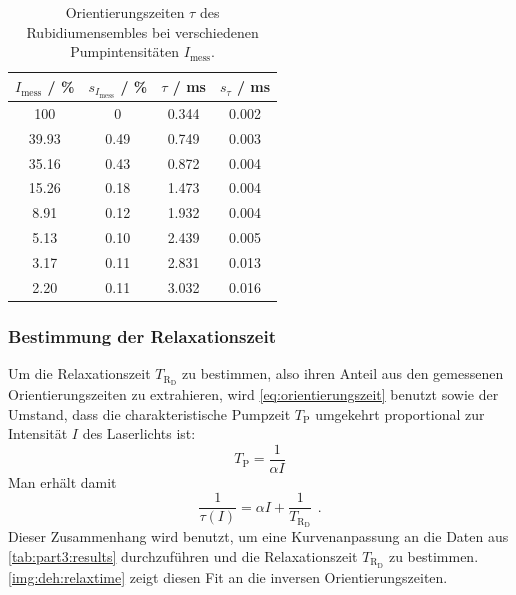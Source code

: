 %

\begin{table}[H]
\caption{Orientierungszeiten $\tau$ des Rubidiumensembles bei verschiedenen Pumpintensitäten $I_{\text{mess}}$.}
\begin{center}
\begin{tabular}{|c|c|c|c|}
  \hline
  $I_\text{mess}$ / \% & $s_{I_\text{mess}}$ / \% & $\tau$ / ms & $s_\tau$ / ms \\ \hline
  100 & 0 & 0.344 & 0.002 \\ \hline
  39.93 & 0.49 & 0.749 & 0.003 \\ \hline
  35.16 & 0.43 & 0.872 & 0.004 \\ \hline
  15.26 & 0.18 & 1.473 & 0.004 \\ \hline
  8.91 & 0.12 & 1.932 & 0.004 \\ \hline
  5.13 & 0.10 & 2.439 & 0.005 \\ \hline
  3.17 & 0.11 & 2.831 & 0.013 \\ \hline
  2.20 & 0.11 & 3.032 & 0.016 \\ \hline
\end{tabular}
\end{center}
\label{tab:deh:fitres}
\end{table}

\subsubsection*{Bestimmung der Relaxationszeit}
Um die Relaxationszeit $T_{\text{R}_\text{D}}$ zu bestimmen, also ihren Anteil aus den gemessenen Orientierungszeiten zu extrahieren,
wird \autoref{eq:orientierungszeit} benutzt sowie der Umstand,
dass die charakteristische Pumpzeit $T_\text{P}$ umgekehrt proportional zur Intensität $I$ des Laserlichts ist:
\begin{equation}
  T_\text{P} = \frac{1}{\alpha I} 
\end{equation}
Man erhält damit
\begin{equation}
  \frac{1}{\tau(I)}=\alpha I + \frac{1}{T_{\text{R}_\text{D}}} \ \,.
\end{equation}
Dieser Zusammenhang wird benutzt, um eine Kurvenanpassung an die Daten aus \autoref{tab:part3:results}
durchzuführen und die Relaxationszeit $T_{\text{R}_\text{D}}$ zu bestimmen.
\autoref{img:deh:relaxtime} zeigt diesen Fit an die inversen Orientierungszeiten.

